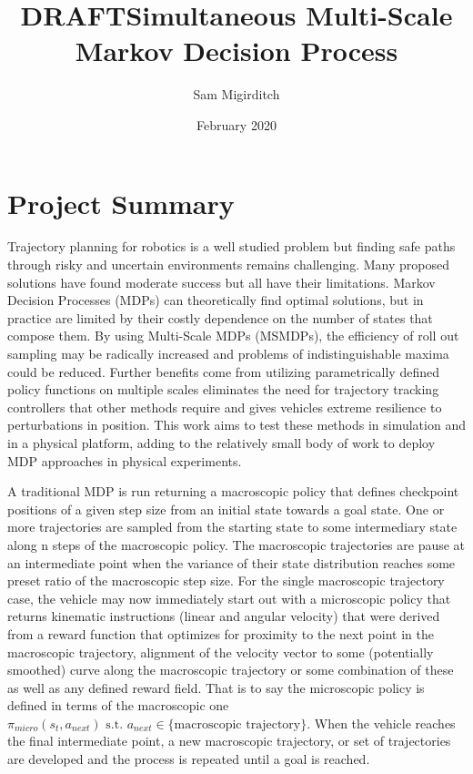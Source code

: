 \documentclass[12pt]{article}
\title{\textbf{DRAFT}\linebreak Simultaneous Multi-Scale Markov Decision Process}
\author{Sam Migirditch}
\date{February 2020}
\begin{document}
\maketitle

\newpage
\section{Project Summary}

Trajectory planning for robotics is a well studied problem but finding safe paths through risky and uncertain environments remains challenging. Many proposed solutions have found moderate success but all have their limitations. Markov Decision Processes (MDPs) can theoretically find optimal solutions, but in practice are limited by their costly dependence on the number of states that compose them. By using Multi-Scale MDPs (MSMDPs), the efficiency of roll out sampling may be radically increased and problems of indistinguishable maxima could be reduced. Further benefits come from utilizing parametrically defined policy functions on multiple scales eliminates the need for trajectory tracking controllers that other methods require and gives vehicles extreme resilience to perturbations in position. This work aims to test these methods in simulation and in a physical platform, adding to the relatively small body of work to deploy MDP approaches in physical experiments. 

A traditional MDP is run returning a macroscopic policy that defines checkpoint positions of a given step size from an initial state towards a goal state. One or more trajectories are sampled from the starting state to some intermediary state along n steps of the macroscopic policy. The macroscopic trajectories are pause at an intermediate point when the variance of their state distribution reaches some preset ratio of the macroscopic step size. For the single macroscopic trajectory case, the vehicle may now immediately start out with a microscopic policy that returns kinematic instructions (linear and angular velocity) that were derived from a reward function that optimizes for proximity to the next point in the  macroscopic trajectory, alignment of the velocity vector to some (potentially smoothed) curve along the macroscopic trajectory or some combination of these as well as any defined reward field. That is to say the microscopic policy is defined in terms of the macroscopic one $\pi_{micro}(s_t,a_{next}) \textrm{ s.t. } a_{next} \in \{\textrm{macroscopic trajectory}\}$. When the vehicle reaches the final intermediate point, a new macroscopic trajectory, or set of trajectories are developed and the process is repeated until a goal is reached.
\end{document}
